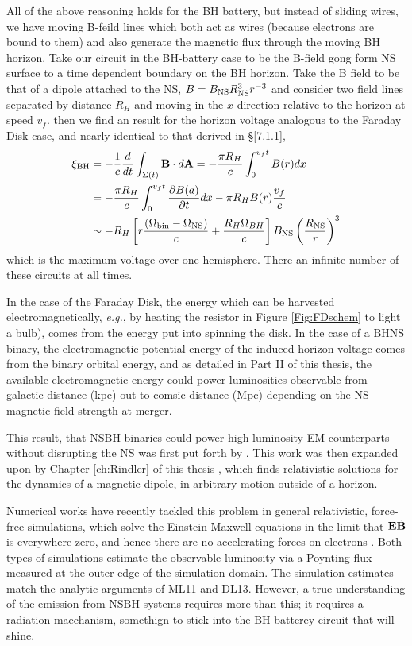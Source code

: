 All of the above reasoning holds for the BH battery, but instead of sliding
wires, we have moving B-feild lines which both act as wires (because electrons
are bound to them) and also generate the magnetic flux through the moving BH
horizon. Take our circuit in the BH-battery case to be the B-field gong form NS surface to a time dependent boundary on the BH horizon. Take the B field to be
that of a dipole attached to the NS, $B = B_{\rm NS} R^3_{\rm NS} r^{-3}$ and
consider two field lines separated by distance $R_H$ and moving in the $x$
direction relative to the horizon at speed $v_f$. then we find an result for
the horizon voltage analogous to the Faraday Disk case, and nearly identical
to that derived in \S \ref{7.1.1},
\begin{align}
\xi_{\rm BH} &= - \frac{1}{c}\frac{d}{dt} \int_{\Sigma(t)}{{\bf B} \cdot d{\bf A}} =  - \frac{\pi R_H}{c} \int^{v_f t}_{0} {B(r) dx}  \\
&=  - \frac{\pi R_H}{c}  \int^{v_f t}_{0}{ \frac{\partial B(a)}{\partial t} dx}  - \pi R_H B(r) \frac{v_f}{c}    \\
& \sim    -R_H \left[r \frac{\left(\Omega_{\rm bin}  - \Omega_{\rm NS}\right)}{c} + \frac{R_H\Omega_{BH}}{c}\right] B_{\rm NS}  \left( \frac{R_{\rm NS}}{r} \right)^3
\end{align}
which is the maximum voltage over one hemisphere. There an infinite number of these circuits at all times. 

In the case of the Faraday Disk, the energy which can be harvested
electromagnetically, \emph{e.g.}, by heating the resistor in Figure
\ref{Fig:FDschem} to light a bulb), comes from the energy put into spinning
the disk. In the case of a BHNS binary, the electromagnetic potential energy
of the induced horizon voltage comes from the binary orbital energy, and as
detailed in Part II of this thesis, the available electromagnetic energy could
power luminosities observable from galactic distance (kpc) out to comsic
distance (Mpc) depending on the NS magnetic field strength at merger.


This result, that NSBH binaries could power high luminosity EM counterparts
without disrupting the NS was first put forth by \cite[ML11][]{McL:2011}. This
work was then expanded upon by Chapter \ref{ch:Rindler} of this thesis
\cite[DL13][]{DL:2013}, which finds relativistic solutions for the dynamics of
a magnetic dipole, in arbitrary motion outside of a horizon.

Numerical works have recently tackled this problem in general relativistic,
force-free simulations, which solve the Einstein-Maxwell equations in the
limit that ${\bf E} \dot {{\bf B}}$ is everywhere zero, and hence there are no
accelerating forces on electrons \citep{Paschalidis:2013}. Both types of
simulations estimate the observable luminosity via a Poynting flux measured at
the outer edge of the simulation domain. The simulation estimates match the
analytic arguments of ML11 and DL13. However, a true understanding of the
emission from NSBH systems requires more than this; it requires a radiation
maechanism, somethign to stick into the BH-batterey circuit that will shine.

